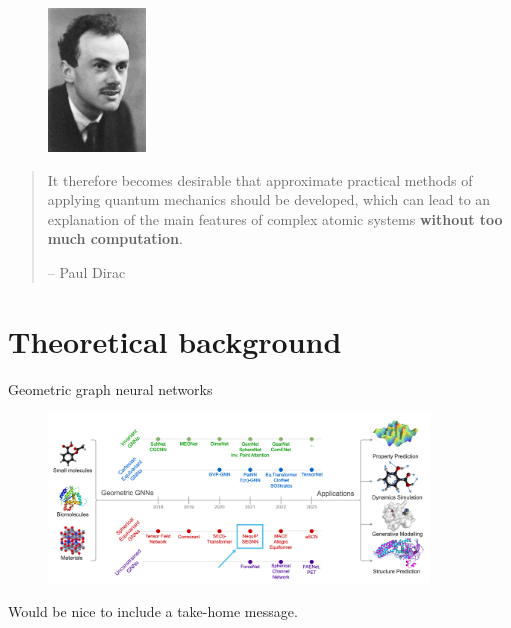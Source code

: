 \documentclass[11pt,t]{beamer}
\begin{document}
\begin{frame}
	\vspace{0.5cm}
	\begin{figure}
		\centering
		\includegraphics[width=0.23\textwidth]{Figures/introduction_paul_dirac.jpg}
	\end{figure}
	\small
	\begin{quotation}
		It therefore becomes desirable that approximate practical methods of applying quantum mechanics should be developed, which can lead to an explanation of the main features of complex atomic systems \textbf{without too much computation}.

		\raggedleft	\normalfont --  Paul Dirac
	\end{quotation}
\end{frame}



\section{Theoretical background}
\begin{frame}{Geometric graph neural networks}
	\vspace{-10pt}
	\begin{figure}
		\centering
		\includegraphics[width=0.9\textwidth]{Figures/theory_geometric_gnns.png}
	\end{figure}
	\small
	Would be nice to include a take-home message.
\end{frame}
\end{document}
